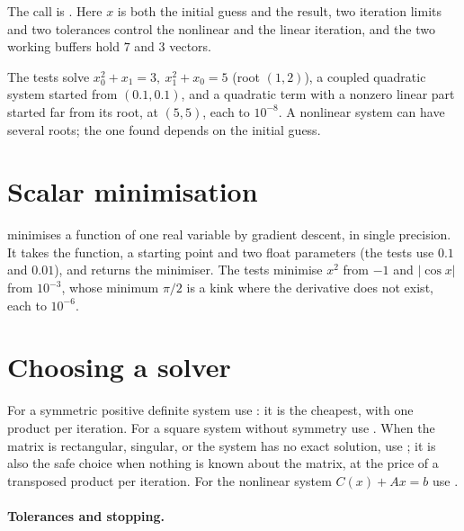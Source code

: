 \documentclass[main.tex]{subfiles}
\begin{document}
    The call is . Here $x$ is both the initial guess and the result, two iteration limits and two tolerances control the nonlinear and the linear iteration, and the two working buffers hold $7$ and $3$ vectors. 

    The tests solve $x_0^2+x_1=3,\ x_1^2+x_0=5$ (root $(1,2)$), a coupled quadratic system started from $(0.1,0.1)$, and a quadratic term with a nonzero linear part started far from its root, at $(5,5)$, each to $10^{-8}$. A nonlinear system can have several roots; the one found depends on the initial guess.

    \section{Scalar minimisation}
     minimises a function of one real variable by gradient descent, in single precision. It takes the function, a starting point and two float parameters (the tests use $0.1$ and $0.01$), and returns the minimiser. The tests minimise $x^2$ from $-1$ and $|\cos x|$ from $10^{-3}$, whose minimum $\pi/2$ is a kink where the derivative does not exist, each to $10^{-6}$. 

    \section{Choosing a solver}
    For a symmetric positive definite system use : it is the cheapest, with one product per iteration. For a square system without symmetry use . When the matrix is rectangular, singular, or the system has no exact solution, use ; it is also the safe choice when nothing is known about the matrix, at the price of a transposed product per iteration. For the nonlinear system $C(x)+Ax=b$ use .

    \paragraph{Tolerances and stopping.}
\end{document}

